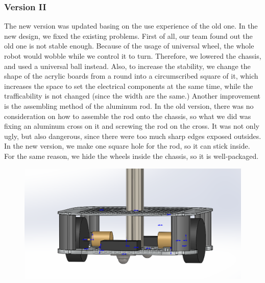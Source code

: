 \documentclass[12pt]{article}
\begin{document}
\subsubsection{Version II}
The new version was updated basing on the use experience of the old one. In the new design, we fixed the existing problems. First of all, our team found out the old one is not stable enough. Because of the usage of universal wheel, the whole robot would wobble while we control it to turn. Therefore, we lowered the chassis, and used a universal ball instead. Also, to increase the stability, we change the shape of the acrylic boards from a round into a circumscribed square of it, which increases the space to set the electrical components at the same time, while the trafficability is not changed (since the width are the same.) Another improvement is the assembling method of the aluminum rod. In the old version, there was no consideration on how to assemble the rod onto the chassis, so what we did was fixing an aluminum cross on it and screwing the rod on the cross. It was not only ugly, but also dangerous, since there were too much sharp edges exposed outsides. In the new version, we make one square hole for the rod, so it can stick inside. For the same reason, we hide the wheels inside the chassis, so it is well-packaged.
\begin{figure}[H]
	\centering
	\includegraphics[width=0.7\linewidth]{Z2}
\end{figure}
\end{document}
